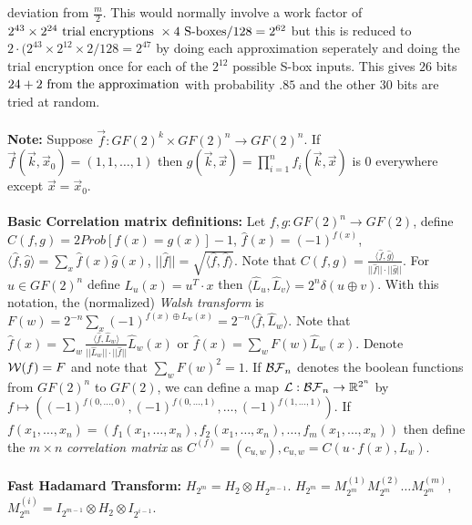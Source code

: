 deviation from ${\frac m 2}$.  This would normally involve a work factor of
$2^{43} \times 2^{24} \textnormal{ trial encryptions } \times 4 \textnormal{ S-boxes}
/ 128= 2^{62}$ but this is reduced to $2 \cdot (2^{43} \times 2^{12} \times 2 / 128= 2^{47}$
by doing each approximation seperately and doing the trial encryption once for each
of the $2^{12}$ possible S-box inputs.  
This gives $26$ bits $24 + 2 \textnormal{ from the approximation}$ 
with probability $.85$ and the other $30$ bits
are tried at random.
\\
\\
{\bf Note: } Suppose ${\vec f}: GF(2)^k \times GF(2)^n \rightarrow GF(2)^n$.
If ${\vec f}({\vec k}, {\vec x}_0)= (1,1, \ldots, 1)$ then
$g({\vec k}, {\vec x})= \prod_{i=1}^n f_i({\vec k}, {\vec x})$ is $0$ everywhere except
${\vec x}= {\vec x}_0$.
\\
\\
{\bf Basic Correlation matrix definitions: }
Let $f,g: GF(2)^n \rightarrow GF(2)$, define
$C(f,g)= 2 Prob[f(x)=g(x)] -1$, $\hat{f}(x) = (-1)^{f(x)}$,
$\langle \hat{f}, \hat{g} \rangle = \sum_x \hat{f}(x) \hat{g}(x) $,
$|| \hat{f}||= \sqrt{\langle \hat{f}, \hat{f} \rangle}$.  Note that
$C(f,g)= {\frac {\langle \hat{f}, \hat{g} \rangle} {||\hat{f}|| \cdot ||\hat{g}||}}$.
For $u \in GF(2)^n$ define $L_u(x)= u^T \cdot x$ then 
$\langle \hat{L}_u , \hat{L}_v \rangle= 2^n \delta (u \oplus v)$.
With this notation, the (normalized) \emph{Walsh transform} is
$F(w)= 2^{-n} \sum_x (-1)^{f(x) \oplus L_w(x)} = 
2^{-n} \langle \hat{f}, \hat{L}_w \rangle$.
Note that 
$\hat{f}(x)= \sum_w {\frac {\langle \hat{f}, \hat{L}_w \rangle} 
{||\hat{L}_w|| \cdot ||\hat{f}||}} \hat{L}_w(x)$ or
$\hat{f}(x)= \sum_w F(w) \hat{L}_w(x)$.  Denote ${\cal W}(f)= F$ and note that
$\sum_w F(w)^2 =1$.  If ${\cal BF}_n$ denotes the boolean functions from
$GF(2)^n$ to $GF(2)$,  we can define a map 
${\cal L}: {\cal BF}_n \rightarrow {\mathbb R}^{2^n}$ by $f \mapsto 
( (-1)^{f(0,\ldots, 0)},
(-1)^{f(0,\ldots, 1)}, \ldots,
(-1)^{f(1,\ldots, 1)})$.
If 
$f(x_1, \ldots, x_n) = (f_1(x_1, \ldots, x_n), f_2(x_1, \ldots, x_n), \ldots, 
f_m(x_1, \ldots, x_n)) $
then define the $m \times n$ \emph{correlation matrix} as $C^{(f)}= (c_{u,w}), 
c_{u,w}= C(u \cdot f(x), L_w)$.
\\
\\
{\bf Fast Hadamard Transform: }
$H_{2^m} = H_2 \otimes H_{2^{m-1}}$.
$H_{2^m}= M^{(1)}_{2^m} M^{(2)}_{2^m} \ldots M^{(m)}_{2^m}$,
$M^{(i)}_{2^m}= I_{2^{m-1}} \otimes H_2 \otimes I_{2^{i-1}}$.
\\
